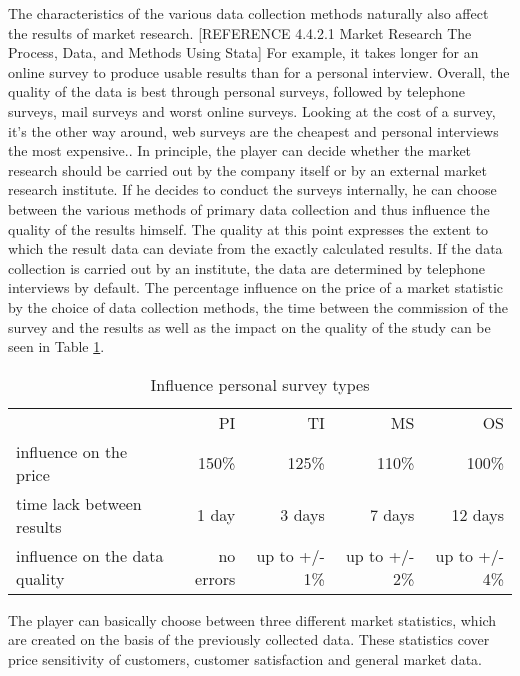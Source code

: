 The characteristics of the various data collection methods naturally also affect the results of market research. [REFERENCE 4.4.2.1 Market Research The Process, Data, and Methods Using Stata] For example, it takes longer for an online survey to produce usable results than for a personal interview. Overall, the quality of the data is best through personal surveys, followed by telephone surveys, mail surveys and worst online surveys. Looking at the cost of a survey, it's the other way around, web surveys are the cheapest and personal interviews the most expensive.. 
In principle, the player can decide whether the market research should be carried out by the company itself or by an external market research institute. If he decides to conduct the surveys internally, he can choose between the various methods of primary data collection and thus influence the quality of the results himself.
The quality at this point expresses the extent to which the result data can deviate from the exactly calculated results. If the data collection is carried out by an institute, the data are determined by telephone interviews by default. The percentage influence on the price of a market statistic by the choice of data collection methods, the time between the commission of the survey and the results as well as the impact on the quality of the study can be seen in Table \ref{MR_survey_types_influence}. 

\begin{table}[ht]
\centering
\begin{tabular}{|l|r|r|r|r|}
\hline
                                 & PI           & TI             & MS             & OS \\
influence on the price           & 150\%        & 125\%          & 110\%          & 100\%   \\
time lack between results        & 1 day        & 3 days         & 7 days         & 12 days   \\
influence on the data quality    & no errors    & up to +/- 1\%  & up to +/- 2\%  & up to +/- 4\%   \\
\hline
\end{tabular}
\caption{Influence personal survey types}
\label{MR_survey_types_influence}
\end{table}

The player can basically choose between three different market statistics, which are created on the basis of the previously collected data. These statistics cover price sensitivity of customers, customer satisfaction and general market data.
 
